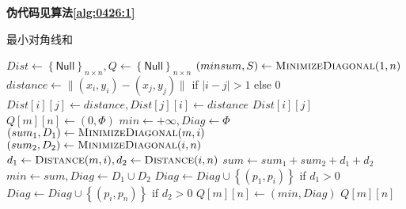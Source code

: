 \begin{questions}
\begin{parts}
\begin{solution}
            \textbf{伪代码见算法\ref{alg:0426:1}}
        \end{solution}

        \begin{algorithm}[!ht]
            \caption{最小对角线和}\label{alg:0426:1}
            \begin{algorithmic}[1]
                \State $Dist \gets \left\{ \mathsf{Null} \right\}_{n \times n}, Q \gets \left\{ \mathsf{Null} \right\}_{n \times n}$
                \State $(minsum, S) \gets \Call{MinimizeDiagonal}{1,n}$
                \Statex
                \State $distance \gets \| (x_i,y_i) - (x_j,y_j) \|$ if $|i-j| > 1$ else $0$
                \State $Dist[i][j] \gets distance, Dist[j][i] \gets distance$
                \EndIf
                \State \Return $Dist[i][j]$
                \EndProcedure
                \Statex
                \Statex {}
                \State $Q[m][n] \gets (0, \Phi)$
                \Else
                \State $min \gets +\infty, Diag \gets \Phi$
                \State $(sum_1, D_1) \gets \Call{MinimizeDiagonal}{m,i}$
                \State $(sum_2, D_2) \gets \Call{MinimizeDiagonal}{i,n}$
                \State $d_1 \gets \Call{Distance}{m,i}, d_2 \gets \Call{Distance}{i,n}$
                \State $sum \gets sum_1 + sum_2 + d_1 + d_2$
                \State $min \gets sum , Diag \gets D_1 \cup D_2$
                \State $Diag \gets Diag \cup \left\{(p_1, p_i) \right\}$ if $d_1 > 0$
                \State $Diag \gets Diag \cup \left\{(p_i, p_n) \right\}$ if $d_2 > 0$
                \EndIf
                \EndFor
                \State $Q[m][n] \gets (min, Diag)$
                \EndIf
                \EndIf
                \State \Return $Q[m][n]$
                \EndProcedure
            \end{algorithmic}
        \end{algorithm}
    \end{parts}


\end{questions}

